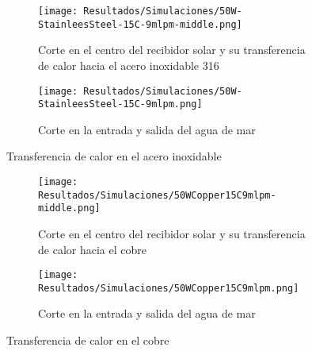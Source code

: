 				\begin{figure}[H]
					\centering
					\begin{subfigure}[t]{\linewidth}
						\centering
						\texttt{[image: Resultados/Simulaciones/50W-StainleesSteel-15C-9mlpm-middle.png]}
						\caption{Corte en el centro del recibidor solar y su transferencia de calor hacia el acero inoxidable 316}
						\label{fig:50W-StainleesSteel-15C-9mlpm-middle}
					\end{subfigure}
					\hfill
					\begin{subfigure}[t]{0.45\linewidth}
						\centering
						\texttt{[image: Resultados/Simulaciones/50W-StainleesSteel-15C-9mlpm.png]}
						\caption{Corte en la entrada y salida del agua de mar}
						\label{fig:50W-StainleesSteel-15C-9mlpm}
					\end{subfigure}
					\hfill
					\caption{Transferencia de calor en el acero inoxidable}
					\label{fig:stainless-steel-heat-transfer}
				\end{figure}
				
				\begin{figure}[H]
					\centering
					\begin{subfigure}[t]{\linewidth}
						\centering
						\texttt{[image: Resultados/Simulaciones/50WCopper15C9mlpm-middle.png]}
						\caption{Corte en el centro del recibidor solar y su transferencia de calor hacia el cobre}
						\label{fig:50WCopper15C9mlpm-middle}
					\end{subfigure}
					\hfill
					\begin{subfigure}[t]{\linewidth}
						\centering
						\texttt{[image: Resultados/Simulaciones/50WCopper15C9mlpm.png]}
						\caption{Corte en la entrada y salida del agua de mar}
						\label{fig:50WCopper15C9mlpm}
					\end{subfigure}
					\hfill
					\caption{Transferencia de calor en el cobre}
					\label{fig:copper-heat-transfer}
				\end{figure}
				
